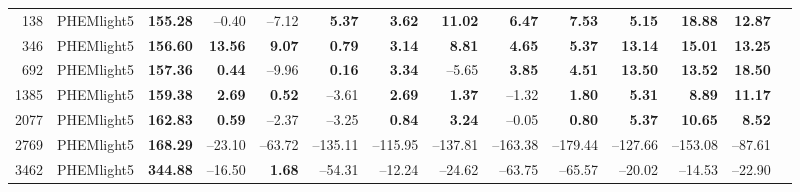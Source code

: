 \begin{table}[htb]
{\begin{tabular}{r l *{12}{r}}
      138  & PHEMlight5 & \textbf{155.28}      & –0.40  & –7.12  & \textbf{5.37}  & \textbf{3.62}  & \textbf{11.02} & \textbf{6.47}  & \textbf{7.53}  & \textbf{5.15}  & \textbf{18.88} & \textbf{12.87} \\
      346  & PHEMlight5 & \textbf{156.60}      & \textbf{13.56} & \textbf{9.07}  & \textbf{0.79}  & \textbf{3.14}  & \textbf{8.81}  & \textbf{4.65}  & \textbf{5.37}  & \textbf{13.14} & \textbf{15.01} & \textbf{13.25} \\
      692  & PHEMlight5 & \textbf{157.36}      & \textbf{0.44}  & –9.96  & \textbf{0.16}  & \textbf{3.34}  & –5.65  & \textbf{3.85}  & \textbf{4.51}  & \textbf{13.50} & \textbf{13.52} & \textbf{18.50} \\
      1385 & PHEMlight5 & \textbf{159.38}      & \textbf{2.69}  & \textbf{0.52}  & –3.61 & \textbf{2.69}  & \textbf{1.37}  & –1.32  & \textbf{1.80}  & \textbf{5.31}  & \textbf{8.89}  & \textbf{11.17} \\
      2077 & PHEMlight5 & \textbf{162.83}      & \textbf{0.59}  & –2.37  & –3.25 & \textbf{0.84}  & \textbf{3.24}  & –0.05  & \textbf{0.80}  & \textbf{5.37}  & \textbf{10.65} & \textbf{8.52}  \\
      2769 & PHEMlight5 & \textbf{168.29}      & –23.10 & –63.72 & –135.11 & –115.95 & –137.81 & –163.38 & –179.44 & –127.66 & –153.08 & –87.61 \\
      3462 & PHEMlight5 & \textbf{344.88}      & –16.50 & \textbf{1.68}  & –54.31 & –12.24 & –24.62 & –63.75 & –65.57 & –20.02 & –14.53 & –22.90 \\
      \bottomrule
    \end{tabular}%
  }
\end{table}
